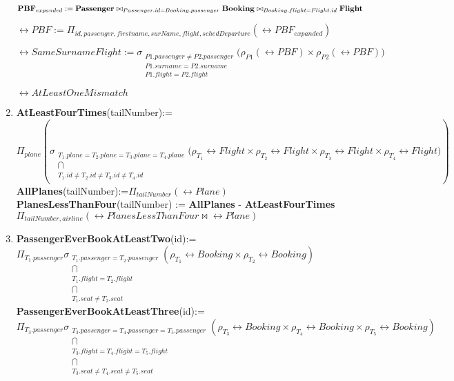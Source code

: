 \begin{enumerate}[label=\textbf{\arabic*.}]
$\textbf{PBF}_{expanded} := \textbf{Passenger} \bowtie_{Passenger.id = Booking.passenger} \textbf{Booking} \bowtie_{Booking.flight = Flight.id} \textbf{Flight}$

$\rel{PBF} := \Pi_{id, passenger, firstname, surName, flight, schedDeparture}(\rel{PBF}_{expanded})$

$\rel{SameSurnameFlight} := \sigma_{\substack{
                              P1.passenger \neq P2.passenger\\
                              P1.surname = P2.surname\\
                              P1.flight = P2.flight}}
                              \bigg(\rho_{P1}(\rel{PBF}) \times \rho_{P2}(\rel{PBF})\bigg)$
                            

$\rel{AtLeastOneMismatch}$


\newpage
\item \textbf{AtLeastFourTimes}(tailNumber):=$\Pi_{plane}(\sigma_{\substack{T_1.plane=T_2.plane=T_3.plane=T_4.plane \\ \bigcap \\ T_1.id \neq T_2.id \neq T_3.id \neq T_4.id\\}}\bigg(\rho_{T_1} \rel{Flight} \times \rho_{T_2} \rel{Flight} \times \rho_{T_3} \rel{Flight} \times \rho_{T_4} \rel{Flight}\bigg))$\\

\textbf{AllPlanes}(tailNumber):=$\Pi_{tailNumber}(\rel{Plane})$\\

\textbf{PlanesLessThanFour}(tailNumber) := \textbf{AllPlanes} - \textbf{AtLeastFourTimes}\\

$\Pi_{tailNumber,airline}(\rel{PlanesLessThanFour} \bowtie \rel{Plane})$

\item \textbf{PassengerEverBookAtLeastTwo}(id):= $\Pi_{T_1.passenger}\sigma_{\substack{T_1.passenger=T_2.passenger \\ \bigcap \\ T_1.flight = T_2.flight \\ \bigcap \\ T_1.seat \neq T_2.seat}}(\rho_{T_1} \rel{Booking}  \times \rho_{T_2} \rel{Booking})$\\

\textbf{PassengerEverBookAtLeastThree}(id):= $\Pi_{T_3.passenger}\sigma_{\substack{T_3.passenger=T_4.passenger=T_5.passenger \\ \bigcap \\ T_3.flight = T_4.flight = T_5.flight\\ \bigcap \\ T_3.seat \neq T_4.seat \neq T_5.seat}}(\rho_{T_3} \rel{Booking}  \times \rho_{T_4} \rel{Booking} \times \rho_{T_5} \rel{Booking})$\\


\end{enumerate}
